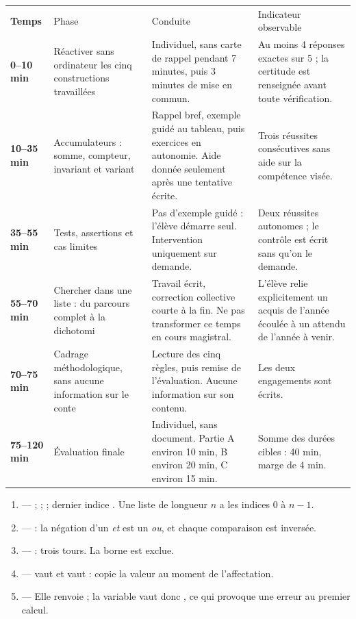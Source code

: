 \documentclass[10pt,a4paper]{article}
\begin{document}
\par\noindent\begin{tabularx}{\linewidth}{>{\bfseries}p{18mm} p{34mm} X X}
\rowcolor{Navy}\color{white}Temps & \color{white}Phase & \color{white}Conduite & \color{white}Indicateur observable \\
0--10 min & Réactiver sans ordinateur les cinq constructions travaillées & Individuel, sans carte de rappel pendant 7 minutes, puis 3 minutes de mise en commun. & Au moins 4 réponses exactes sur 5 ; la certitude est renseignée avant toute vérification. \\
10--35 min & Accumulateurs : somme, compteur, invariant et variant & Rappel bref, exemple guidé au tableau, puis exercices en autonomie. Aide donnée seulement après une tentative écrite. & Trois réussites consécutives sans aide sur la compétence visée. \\
35--55 min & Tests, assertions et cas limites & Pas d'exemple guidé : l'élève démarre seul. Intervention uniquement sur demande. & Deux réussites autonomes ; le contrôle est écrit sans qu'on le demande. \\
55--70 min & Chercher dans une liste : du parcours complet à la dichotomi & Travail écrit, correction collective courte à la fin. Ne pas transformer ce temps en cours magistral. & L'élève relie explicitement un acquis de l'année écoulée à un attendu de l'année à venir. \\
70--75 min & Cadrage méthodologique, sans aucune information sur le conte & Lecture des cinq règles, puis remise de l'évaluation. Aucune information sur son contenu. & Les deux engagements sont écrits. \\
75--120 min & Évaluation finale & Individuel, sans document. Partie A environ 10 min, B environ 20 min, C environ 15 min. & Somme des durées cibles : 40 min, marge de 4 min. \\
\end{tabularx}
\newpage{}
\begin{enumerate}
\item {} ---  ;  ;  ; dernier indice . Une liste de longueur $n$ a les indices $0$ à $n-1$.
\item {} ---  : la négation d'un \emph{et} est un \emph{ou}, et chaque comparaison est inversée.
\item {} ---  : trois tours. La borne  est exclue.
\item {} ---  vaut  et  vaut  :  copie la valeur au moment de l'affectation.
\item {} --- Elle renvoie  ; la variable vaut donc , ce qui provoque une erreur au premier calcul.
\end{enumerate}
\end{document}
